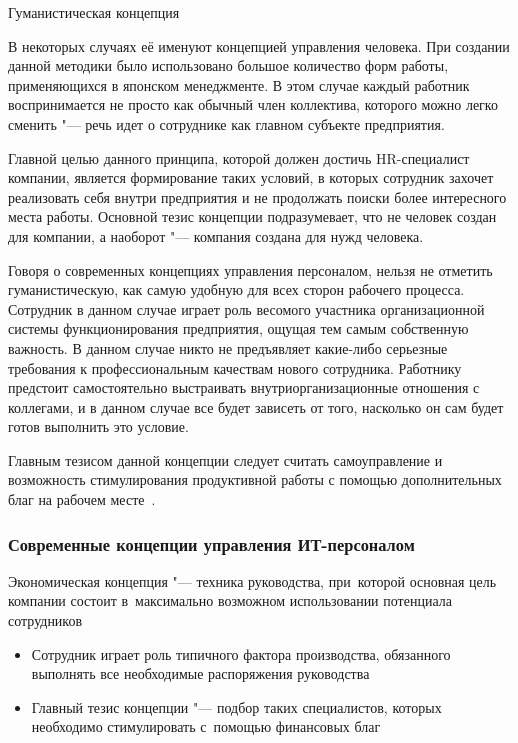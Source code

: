 \documentclass{../industrial-development}
\begin{document}
\lecturenotes

\alert{Гуманистическая концепция}

В некоторых случаях её именуют концепцией управления человека. При создании данной методики было использовано большое количество форм работы, применяющихся в японском менеджменте. В этом случае каждый работник воспринимается не просто как обычный член коллектива, которого можно легко сменить "--- речь идет о сотруднике как главном субъекте предприятия.

Главной целью данного принципа, которой должен достичь HR-специалист компании, является формирование таких условий, в которых сотрудник захочет реализовать себя внутри предприятия и не продолжать поиски более интересного места работы. Основной тезис концепции подразумевает, что не человек создан для компании, а наоборот "--- компания создана для нужд человека.

Говоря о современных концепциях управления персоналом, нельзя не отметить гуманистическую, как самую удобную для всех сторон рабочего процесса. Сотрудник в данном случае играет роль весомого участника организационной системы функционирования предприятия, ощущая тем самым собственную важность. В данном случае никто не предъявляет какие-либо серьезные требования к профессиональным качествам нового сотрудника. Работнику предстоит самостоятельно выстраивать внутриорганизационные отношения с коллегами, и в данном случае все будет зависеть от того, насколько он сам будет готов выполнить это условие.

Главным тезисом данной концепции следует считать самоуправление и возможность стимулирования продуктивной работы с помощью дополнительных благ на рабочем месте~\cite{Sovrconcept}. 

\begin{frame} \frametitle{Современные концепции управления ИТ-персоналом}

\alert{Экономическая концепция} "--- техника руководства, при~которой основная цель компании состоит в~максимально возможном использовании потенциала сотрудников
  \begin{itemize}
	\item Сотрудник играет роль типичного фактора производства, обязанного выполнять все необходимые распоряжения руководства
	\item Главный тезис концепции "--- подбор таких специалистов, которых необходимо стимулировать с~помощью финансовых благ
	  \end{itemize}
\end{frame}
\end{document}
